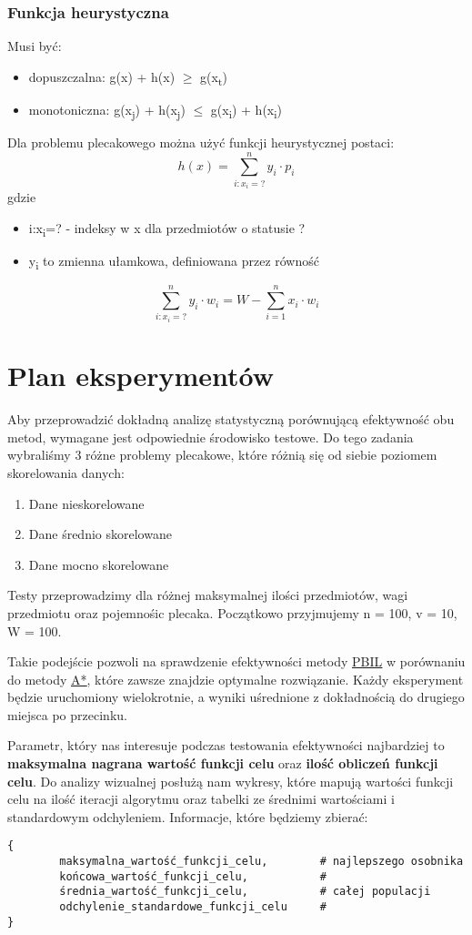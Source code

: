 \documentclass[11pt]{article}
\begin{document}
\subsubsection{Funkcja heurystyczna}
\label{sec:orgc1f6e15}
Musi być:
\begin{itemize}
\item dopuszczalna: g(x) + h(x) \(\ge\) g(x\textsubscript{t})
\item monotoniczna: g(x\textsubscript{j}) + h(x\textsubscript{j}) \(\le\) g(x\textsubscript{i}) + h(x\textsubscript{i})
\end{itemize}
Dla problemu plecakowego można użyć funkcji heurystycznej postaci:
\[
        h(x) = \sum_{i:x_i=?}^n{y_i \cdot p_i}
\]
gdzie
\begin{itemize}
\item i:x\textsubscript{i}=? - indeksy w x dla przedmiotów o statusie ?
\item y\textsubscript{i} to zmienna ułamkowa, definiowana przez równość
\end{itemize}
\[
        \sum_{i:x_i=?}^n{y_i \cdot w_i} = W - \sum_{i=1}^n{x_i \cdot w_i}
\]
\section{Plan eksperymentów}
\label{sec:org6d89171}
Aby przeprowadzić dokładną analizę statystyczną porównującą efektywność obu metod, wymagane jest odpowiednie środowisko testowe. Do tego zadania wybraliśmy 3 różne problemy plecakowe, które różnią się od siebie poziomem skorelowania danych:
\begin{enumerate}
\item Dane nieskorelowane
\item Dane średnio skorelowane
\item Dane mocno skorelowane
\end{enumerate}
Testy przeprowadzimy dla różnej maksymalnej ilości przedmiotów, wagi przedmiotu oraz pojemnośic plecaka. Początkowo przyjmujemy n = 100, v = 10, W = 100.

Takie podejście pozwoli na sprawdzenie efektywności metody \uline{\hyperref[sec:org20e38e5]{PBIL}} w porównaniu do metody \hyperref[sec:org9b81fc2]{\uline{A*}}, które zawsze znajdzie optymalne rozwiązanie. Każdy eksperyment będzie uruchomiony wielokrotnie, a wyniki uśrednione z dokładnością do drugiego miejsca po przecinku.

Parametr, który nas interesuje podczas testowania efektywności najbardziej to \textbf{maksymalna nagrana wartość funkcji celu} oraz \textbf{ilość obliczeń funkcji celu}. Do analizy wizualnej posłużą nam wykresy, które mapują wartości funkcji celu na ilość iteracji algorytmu oraz tabelki ze średnimi wartościami i standardowym odchyleniem. Informacje, które będziemy zbierać:
\begin{verbatim}
{
        maksymalna_wartość_funkcji_celu,        # najlepszego osobnika
        końcowa_wartość_funkcji_celu,           #
        średnia_wartość_funkcji_celu,           # całej populacji
        odchylenie_standardowe_funkcji_celu     #
}
\end{verbatim}
\end{document}
